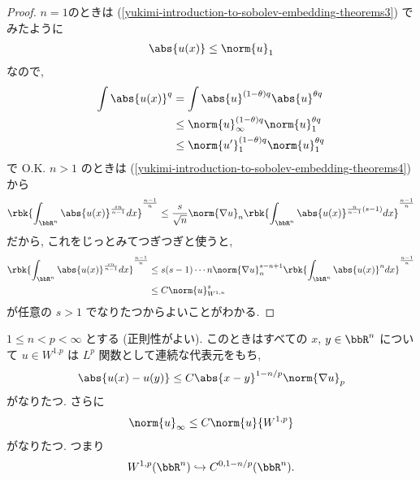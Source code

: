\documentclass[openany, a4paper, oneside]{jsbook}
\begin{document}
\begin{proof}
$n=1$のときは (\ref{yukimi-introduction-to-sobolev-embedding-theorems3}) でみたように
\begin{align}
 \abs{u(x)}
 \le
 \norm{u}_1
\end{align}
なので,
\begin{align}
 \int \abs{u(x)}^q
 &=
 \int \abs{u}^{(1-\theta) q} \abs{u}^{\theta q} \\
 &\le
 \norm{u}_{\infty}^{(1-\theta) q} \norm{u}_1^{\theta q} \\
 &\le
 \norm{u'}_1^{(1-\theta) q} \norm{u}_1^{\theta q}
\end{align}
で O.K.
$n > 1$ のときは (\ref{yukimi-introduction-to-sobolev-embedding-theorems4}) から
\begin{align}
 \rbk{\int_{\bbR^{n}} \abs{u(x)}^{\frac{sn}{n-1}}dx}^{\frac{n-1}{n}}
 \le
 \frac{s}{\sqrt{n}} \norm{\nabla u}_n
  \rbk{\int_{\bbR^{n}} \abs{u(x)}^{\frac{n}{n-1}(s-1)} dx}^{\frac{n-1}{n}}
\end{align}
だから, これをじっとみてつぎつぎと使うと,
\begin{align}
 \rbk{\int_{\bbR^{n}} \abs{u(x)}^{\frac{sn}{n-1}} dx}^{\frac{n-1}{n}}
 &\le
 s (s-1) \cdots n \norm{\nabla u}_n^{s-n+1}
  \rbk{\int_{\bbR^{n}} \abs{u(x)}^n dx}^{\frac{n-1}{n}} \\
 &\le
 C \norm{u}_{W^{1, n}}^{s}
\end{align}
が任意の $s > 1$ でなりたつからよいことがわかる.
\end{proof}
\begin{thm}[Morray]
 $1 \le n < p < \infty$ とする (正則性がよい).
 このときはすべての $x$, $y \in \bbR^n$ について $u \in W^{1. p}$ は $L^p$ 関数として連続な代表元をもち,
 \begin{align}
  \abs{u(x) - u(y)}
  \le
  C \abs{x - y}^{1-n/p} \norm{\nabla u}_p
 \end{align}
 がなりたつ.
 さらに
 \begin{align}
  \norm{u}_{\infty}
  \leq
  C \norm{u}{W^{1, p}}
 \end{align}
 がなりたつ.
 つまり
 \begin{align}
  W^{1, p}(\bbR^n)
  \hookrightarrow
  C^{0, 1-n/p}(\bbR^n).
 \end{align}
\end{thm}
\end{document}

